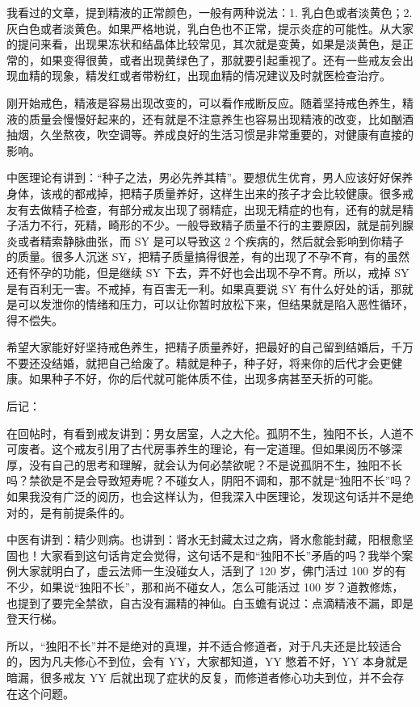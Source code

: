 \documentclass{ctexart}
\begin{document}
我看过的文章，提到精液的正常颜色，一般有两种说法：1. 乳白色或者淡黄色；2. 灰白色或者淡黄色。如果严格地说，乳白色也不正常，提示炎症的可能性。从大家的提问来看，出现果冻状和结晶体比较常见，其次就是变黄，如果是淡黄色，是正常的，如果变得很黄，或者出现黄绿色了，那就要引起重视了。还有一些戒友会出现血精的现象，精发红或者带粉红，出现血精的情况建议及时就医检查治疗。

刚开始戒色，精液是容易出现改变的，可以看作戒断反应。随着坚持戒色养生，精液的质量会慢慢好起来的，还有就是不注意养生也容易出现精液的改变，比如酗酒抽烟，久坐熬夜，吹空调等。养成良好的生活习惯是非常重要的，对健康有直接的影响。

中医理论有讲到：“种子之法，男必先养其精”。要想优生优育，男人应该好好保养身体，该戒的都戒掉，把精子质量养好，这样生出来的孩子才会比较健康。很多戒友有去做精子检查，有部分戒友出现了弱精症，出现无精症的也有，还有的就是精子活力不行，死精，畸形的不少。一般导致精子质量不行的主要原因，就是前列腺炎或者精索静脉曲张，而 SY 是可以导致这 2 个疾病的，然后就会影响到你精子的质量。很多人沉迷 SY，把精子质量搞得很差，有的出现了不孕不育，有的虽然还有怀孕的功能，但是继续 SY 下去，弄不好也会出现不孕不育。所以，戒掉 SY 是有百利无一害。不戒掉，有百害无一利。如果真要说 SY 有什么好处的话，那就是可以发泄你的情绪和压力，可以让你暂时放松下来，但结果就是陷入恶性循环，得不偿失。

希望大家能好好坚持戒色养生，把精子质量养好，把最好的自己留到结婚后，千万不要还没结婚，就把自己给废了。精就是种子，种子好，将来你的后代才会更健康。如果种子不好，你的后代就可能体质不佳，出现多病甚至夭折的可能。

后记：

在回帖时，有看到戒友讲到：男女居室，人之大伦。孤阴不生，独阳不长，人道不可废者。这个戒友引用了古代房事养生的理论，有一定道理。但如果阅历不够深厚，没有自己的思考和理解，就会认为何必禁欲呢？不是说孤阴不生，独阳不长吗？禁欲是不是会导致短寿呢？不碰女人，阴阳不调和，那不就是“独阳不长”吗？如果我没有广泛的阅历，也会这样认为，但我深入中医理论，发现这句话并不是绝对的，是有前提条件的。

中医有讲到：精少则病。也讲到：肾水无封藏太过之病，肾水愈能封藏，阳根愈坚固也！大家看到这句话肯定会觉得，这句话不是和“独阳不长”矛盾的吗？我举个案例大家就明白了，虚云法师一生没碰女人，活到了 120 岁，佛门活过 100 岁的有不少，如果说“独阳不长”，那和尚不碰女人，怎么可能活过 100 岁？道教修炼，也提到了要完全禁欲，自古没有漏精的神仙。白玉蟾有说过：点滴精液不漏，即是登天行梯。

所以，“独阳不长”并不是绝对的真理，并不适合修道者，对于凡夫还是比较适合的，因为凡夫修心不到位，会有 YY，大家都知道，YY 憋着不好，YY 本身就是暗漏，很多戒友 YY 后就出现了症状的反复，而修道者修心功夫到位，并不会存在这个问题。
\end{document}
